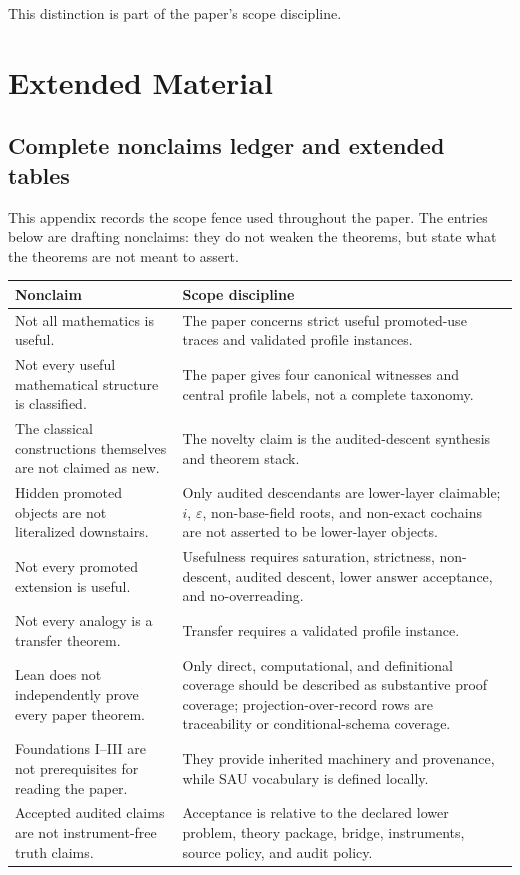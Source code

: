 \documentclass[11pt]{article}
\theoremstyle{definition}
\begin{document}
This distinction is part of the paper's scope discipline.
 \section{Extended Material}\label{app:extended-material}

\subsection{Complete nonclaims ledger and extended tables}
\label{appsubsec:extended-material-nonclaims}

This appendix records the scope fence used throughout the paper.  The entries
below are drafting nonclaims: they do not weaken the theorems, but state what
the theorems are not meant to assert.

\begin{center}
\small
\begin{tabular}{@{}>{\raggedright\arraybackslash}p{}>{\raggedright\arraybackslash}p{}@{}}
\toprule
Nonclaim & Scope discipline\\
\midrule
Not all mathematics is useful. &
The paper concerns strict useful promoted-use traces and validated profile instances.\\
Not every useful mathematical structure is classified. &
The paper gives four canonical witnesses and central profile labels, not a complete taxonomy.\\
The classical constructions themselves are not claimed as new. &
The novelty claim is the audited-descent synthesis and theorem stack.\\
Hidden promoted objects are not literalized downstairs. &
Only audited descendants are lower-layer claimable; \(i\), \(\varepsilon\), non-base-field roots, and non-exact cochains are not asserted to be lower-layer objects.\\
Not every promoted extension is useful. &
Usefulness requires saturation, strictness, non-descent, audited descent, lower answer acceptance, and no-overreading.\\
Not every analogy is a transfer theorem. &
Transfer requires a validated profile instance.\\
Lean does not independently prove every paper theorem. &
Only direct, computational, and definitional coverage should be described as substantive proof coverage; projection-over-record rows are traceability or conditional-schema coverage.\\
Foundations I--III are not prerequisites for reading the paper. &
They provide inherited machinery and provenance, while SAU vocabulary is defined locally.\\
Accepted audited claims are not instrument-free truth claims. &
Acceptance is relative to the declared lower problem, theory package, bridge, instruments, source policy, and audit policy.\\
\bottomrule
\end{tabular}
\end{center}
\end{document}
